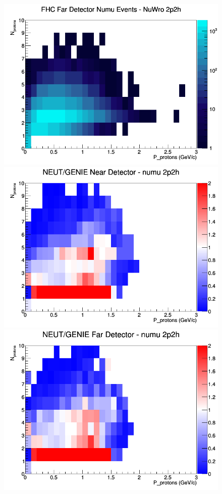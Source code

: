 \documentclass[12pt]{article}
\begin{document}
\begin{figure}[h]
\endminipage
{}
\includegraphics[width=\linewidth]{N_P/nominal/protons/2p2h_FHC_FD_numu_N_P_NuWro.png}
\endminipage
\newline
{}
\includegraphics[width=\linewidth]{N_P/nominal/protons/ratios/2p2h_NEUT_GENIE_numu_near_N_P.png}
\endminipage
{}
\includegraphics[width=\linewidth]{N_P/nominal/protons/ratios/2p2h_NEUT_GENIE_numu_far_N_P.png}

\end{figure}
\end{document}
